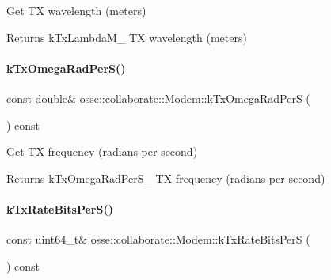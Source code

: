 Get TX wavelength (meters) 

\begin{DoxyReturn}{Returns}
k\+Tx\+Lambda\+M\+\_\+ TX wavelength (meters) 
\end{DoxyReturn}
\mbox{\label{classosse_1_1collaborate_1_1_modem_a42bfe0c78e94eaf71bd3186b6bde1e9d}} 
\paragraph{\texorpdfstring{k\+Tx\+Omega\+Rad\+Per\+S()}{kTxOmegaRadPerS()}}
{\footnotesize\ttfamily const double\& osse\+::collaborate\+::\+Modem\+::k\+Tx\+Omega\+Rad\+PerS (\begin{DoxyParamCaption}{ }\end{DoxyParamCaption}) const\hspace{0.3cm}{\ttfamily [inline]}}



Get TX frequency (radians per second) 

\begin{DoxyReturn}{Returns}
k\+Tx\+Omega\+Rad\+Per\+S\+\_\+ TX frequency (radians per second) 
\end{DoxyReturn}
\mbox{\label{classosse_1_1collaborate_1_1_modem_a375ff44cbc39181e15e3bfc839551cb4}} 
\paragraph{\texorpdfstring{k\+Tx\+Rate\+Bits\+Per\+S()}{kTxRateBitsPerS()}}
{\footnotesize\ttfamily const uint64\+\_\+t\& osse\+::collaborate\+::\+Modem\+::k\+Tx\+Rate\+Bits\+PerS (\begin{DoxyParamCaption}{ }\end{DoxyParamCaption}) const\hspace{0.3cm}{\ttfamily [inline]}}




